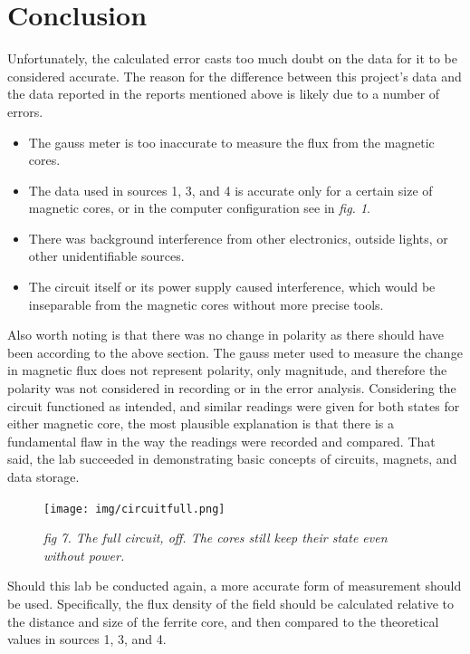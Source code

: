 \documentclass{article}
\begin{document}
\newpage\section{Conclusion}
\noindent Unfortunately, the calculated error casts too much doubt on the data for it to be considered accurate. The reason for the difference between this project's data and the data reported in the reports mentioned above is likely due to a number of errors.
\begin{itemize}
  \item The gauss meter is too inaccurate to measure the flux from the magnetic cores.
  \item The data used in sources 1, 3, and 4 is accurate only for a certain size of magnetic cores, or in the computer configuration see in \emph{fig. 1}.
  \item There was background interference from other electronics, outside lights, or other unidentifiable sources. 
  \item The circuit itself or its power supply caused interference, which would be inseparable from the magnetic cores without more precise tools.
\end{itemize}
\noindent Also worth noting is that there was no change in polarity as there should have been according to the above section. The gauss meter used to measure the change in magnetic flux does not represent polarity, only magnitude, and therefore the polarity was not considered in recording or in the error analysis.
\newline
\noindent Considering the circuit functioned as intended, and similar readings were given for both states for either magnetic core, the most plausible explanation is that there is a fundamental flaw in the way the readings were recorded and compared. That said, the lab succeeded in demonstrating basic concepts of circuits, magnets, and data storage.

\begin{figure}[h]\centering
  \texttt{[image: img/circuitfull.png]}
  \caption{\small\emph{fig 7. The full circuit, off. The cores still keep their state even without power.}}
\end{figure}

\noindent Should this lab be conducted again, a more accurate form of measurement should be used. Specifically, the flux density of the field should be calculated relative to the distance and size of the ferrite core, and then compared to the theoretical values in sources 1, 3, and 4.
\end{document}
